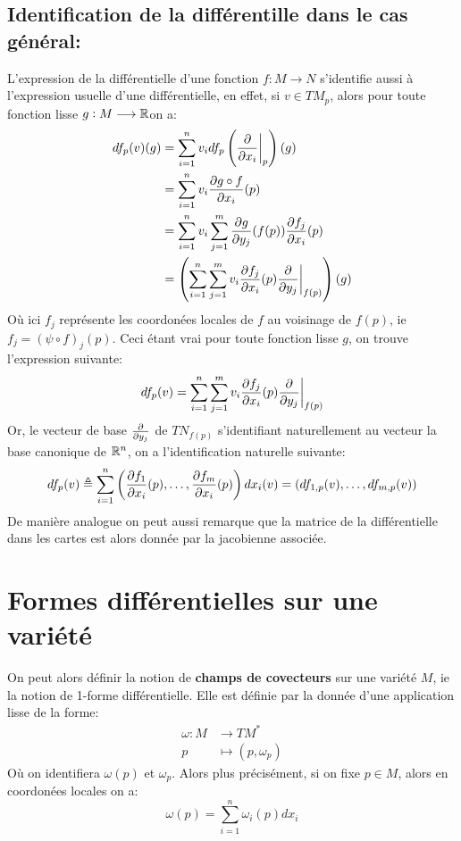 \section{Identification de la différentille dans le cas général:}
L'expression de la différentielle d'une fonction \( f : M \longrightarrow N \) s'identifie aussi à l'expression usuelle d'une différentielle, en effet, si \( v \in TM_p \), alors pour toute fonction lisse \( g : M \longrightarrow \mathbb{R} \)on a:
\begin{align*}
   df_p(v)(g) &= \sum_{i=1}^n v_i df_p\left(\frac{\partial }{\partial x_i}\biggr|_p\right)(g)\\
   &= \sum_{i=1}^n v_i \frac{\partial g \circ f}{\partial x_i}(p)\\
   &= \sum_{i=1}^n v_i \sum_{j=1}^m \frac{\partial g}{\partial y_j}(f(p)) \frac{\partial f_j}{\partial x_i}(p)\\
   &= \left(\sum_{i=1}^n\sum_{j=1}^m v_i \frac{\partial f_j}{\partial x_i}(p)\frac{\partial }{\partial y_j}\biggr|_{f(p)}\right)(g)
\end{align*}
Où ici \( f_j \) représente les coordonées locales de \( f \) au voisinage de \( f(p) \), ie \( f_j = (\psi \circ f)_j(p) \). Ceci étant vrai pour toute fonction lisse \( g \), on trouve l'expression suivante:
\[ 
   df_p(v) = \sum_{i=1}^n\sum_{j=1}^m v_i \frac{\partial f_j}{\partial x_i}(p)\frac{\partial }{\partial y_j}\biggr|_{f(p)}
\]
Or, le vecteur de base \(\frac{\partial }{\partial y_j}\) de \( TN_{f(p)} \) s'identifiant naturellement au vecteur la base canonique de \( \mathbb{R}^n \), on a l'identification naturelle suivante:
\[ 
   df_p(v) \triangleq \sum_{i=1}^n \left( \frac{\partial f_1}{\partial x_i}(p), \ldots, \frac{\partial f_m}{\partial x_i}(p)\right)dx_i(v) = (df_{1, p}(v), \ldots, df_{m, p}(v))
\]
De manière analogue on peut aussi remarque que la matrice de la différentielle dans les cartes est alors donnée par la jacobienne associée.
\chapter{Formes différentielles sur une variété}
On peut alors définir la notion de \textbf{champs de covecteurs} sur une variété \( M \), ie la notion de 1-forme différentielle. Elle est définie par la donnée d'une application lisse de la forme:
\[ 
   \begin{aligned}
      \omega : M &\longrightarrow TM^* \\
      p &\longmapsto (p, \omega_p)
   \end{aligned} 
\]
Où on identifiera \( \omega(p) \) et \(\omega_p\). Alors plus précisément, si on fixe \( p \in M \), alors en coordonées locales on a:
\[ 
   \omega(p) = \sum_{i = 1}^n \omega_i(p) dx_i
\]
